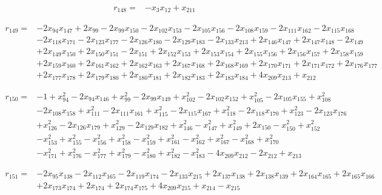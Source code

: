 \documentclass[10pt,letterpaper]{article}
\theoremstyle{remark}\newtheorem{remark}[theorem]{Remark}
\begin{document}
\begin{align*}
r_{148}={}&-x_{3}x_{12}+x_{211}
\end{align*}

\begin{align*}
r_{149}={}&-2x_{94}x_{147}+2x_{99}-2x_{99}x_{150}-2x_{102}x_{153}-2x_{105}x_{156}-2x_{108}x_{159}-2x_{111}x_{162}-2x_{115}x_{168}\\
&-2x_{118}x_{171}-2x_{123}x_{177}-2x_{126}x_{180}-2x_{129}x_{183}-2x_{133}x_{213}+2x_{146}x_{147}+2x_{147}x_{148}-2x_{149}\\
&+2x_{149}x_{150}+2x_{150}x_{151}-2x_{151}+2x_{152}x_{153}+2x_{153}x_{154}+2x_{155}x_{156}+2x_{156}x_{157}+2x_{158}x_{159}\\
&+2x_{159}x_{160}+2x_{161}x_{162}+2x_{162}x_{163}+2x_{167}x_{168}+2x_{168}x_{169}+2x_{170}x_{171}+2x_{171}x_{172}+2x_{176}x_{177}\\
&+2x_{177}x_{178}+2x_{179}x_{180}+2x_{180}x_{181}+2x_{182}x_{183}+2x_{183}x_{184}+4x_{209}x_{213}+x_{212}
\end{align*}

\begin{align*}
r_{150}={}&-1+x_{94}^{2}-2x_{94}x_{146}+x_{99}^{2}-2x_{99}x_{149}+x_{102}^{2}-2x_{102}x_{152}+x_{105}^{2}-2x_{105}x_{155}+x_{108}^{2}\\
&-2x_{108}x_{158}+x_{111}^{2}-2x_{111}x_{161}+x_{115}^{2}-2x_{115}x_{167}+x_{118}^{2}-2x_{118}x_{170}+x_{123}^{2}-2x_{123}x_{176}\\
&+x_{126}^{2}-2x_{126}x_{179}+x_{129}^{2}-2x_{129}x_{182}+x_{146}^{2}-x_{147}^{2}+x_{149}^{2}+2x_{150}-x_{150}^{2}+x_{152}^{2}\\
&-x_{153}^{2}+x_{155}^{2}-x_{156}^{2}+x_{158}^{2}-x_{159}^{2}+x_{161}^{2}-x_{162}^{2}+x_{167}^{2}-x_{168}^{2}+x_{170}^{2}\\
&-x_{171}^{2}+x_{176}^{2}-x_{177}^{2}+x_{179}^{2}-x_{180}^{2}+x_{182}^{2}-x_{183}^{2}-4x_{209}x_{212}-2x_{212}+x_{213}
\end{align*}

\begin{align*}
r_{151}={}&-2x_{95}x_{138}-2x_{112}x_{165}-2x_{119}x_{174}-2x_{133}x_{215}+2x_{137}x_{138}+2x_{138}x_{139}+2x_{164}x_{165}+2x_{165}x_{166}\\
&+2x_{173}x_{174}+2x_{174}+2x_{174}x_{175}+4x_{209}x_{215}+x_{214}-x_{215}
\end{align*}
\end{document}
